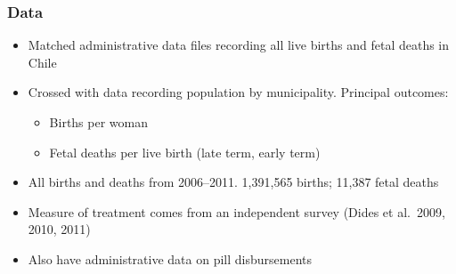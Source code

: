\documentclass[10pt,letterpaper,subeqn]{beamer}
\begin{document}
\begin{frame}[label=sum]
\frametitle{Data}
\begin{itemize}
\item Matched administrative data files recording all live births and fetal deaths in Chile
\item Crossed with data recording population by municipality.  Principal outcomes:
\begin{itemize}
\item Births per woman
\item Fetal deaths per live birth (late term, early term)
\end{itemize}
\item All births and deaths from 2006--2011.  1,391,565 births; 11,387 fetal deaths
\item Measure of treatment comes from an independent survey (Dides et al.\ 2009, 2010, 2011)
\item Also have administrative data on pill disbursements
\end{itemize}
\hyperlink{sumR}{}
\end{frame}




\end{document}

